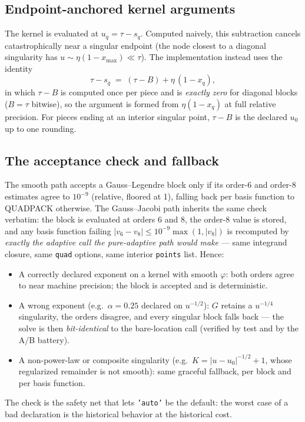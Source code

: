 \documentclass[11pt]{article}
\newcommand{\kw}[1]{\texttt{#1}}
\begin{document}
\subsection{Endpoint-anchored kernel arguments}
The kernel is evaluated at $u_q=\tau-s_q$. Computed naively, this
subtraction cancels catastrophically near a singular endpoint (the node
closest to a diagonal singularity has
$u\sim\eta(1-x_{\max})\ll\tau$). The implementation instead uses the
identity
\[
  \tau - s_q \;=\; (\tau - B) + \eta\,(1 - x_q),
\]
in which $\tau-B$ is computed once per piece and is \emph{exactly zero}
for diagonal blocks ($B=\tau$ bitwise), so the argument is formed from
$\eta(1-x_q)$ at full relative precision. For pieces ending at an interior
singular point, $\tau-B$ is the declared $u_0$ up to one rounding.

\subsection{The acceptance check and fallback}\label{sec:check}
The smooth path accepts a Gauss--Legendre block only if its order-6 and
order-8 estimates agree to $10^{-9}$ (relative, floored at 1), falling
back per basis function to QUADPACK otherwise. The Gauss--Jacobi path
inherits the same check verbatim: the block is evaluated at orders 6 and
8, the order-8 value is stored, and any basis function failing
$|v_6-v_8|\le 10^{-9}\max(1,|v_8|)$ is recomputed by \emph{exactly the
adaptive call the pure-adaptive path would make} --- same integrand
closure, same \kw{quad} options, same interior \kw{points} list. Hence:
\begin{itemize}
  \item A correctly declared exponent on a kernel with smooth $\varphi$:
  both orders agree to near machine precision; the block is accepted and
  is deterministic.
  \item A wrong exponent (e.g.\ $\alpha=0.25$ declared on $u^{-1/2}$):
  $G$ retains a $u^{-1/4}$ singularity, the orders disagree, and every
  singular block falls back --- the solve is then \emph{bit-identical} to
  the bare-location call (verified by test and by the A/B battery).
  \item A non-power-law or composite singularity (e.g.\
  $K=|u-u_0|^{-1/2}+1$, whose regularized remainder is not smooth): same
  graceful fallback, per block and per basis function.
\end{itemize}
The check is the safety net that lets \kw{'auto'} be the default: the
worst case of a bad declaration is the historical behavior at the
historical cost.
\end{document}
